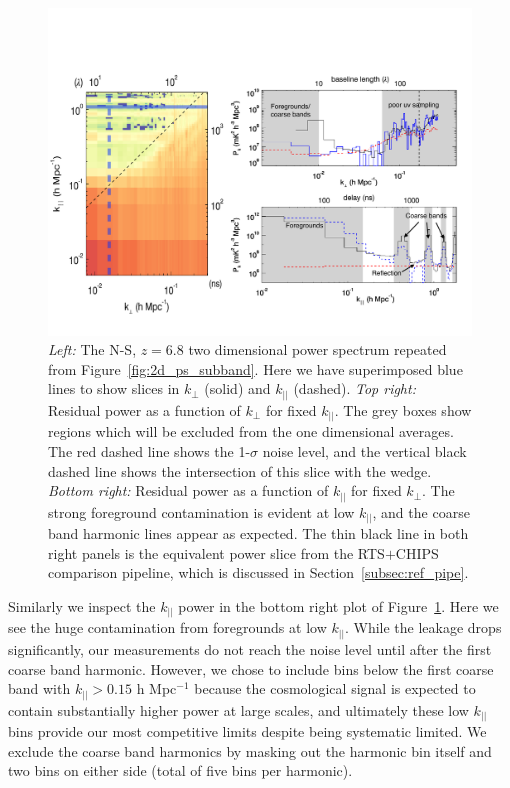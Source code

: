 \documentclass[iop]{emulateapj}
\begin{document}
\begin{figure}
\begin{center}
\includegraphics[width=\textwidth]{slices.pdf}
\caption{
\emph{Left:} The N-S, $z=6.8$ two dimensional power spectrum repeated from 
Figure~\ref{fig:2d_ps_subband}. Here we have superimposed blue lines to show slices in
$k_{\perp}$ (solid) and $k_{||}$ (dashed). \emph{Top right:} Residual power as a function
of $k_{\perp}$ for fixed $k_{||}$. The grey boxes show regions which will be excluded from
the one dimensional averages. The red dashed line shows the 1-$\sigma$ noise level, and
the vertical black dashed line shows the intersection of this slice with the wedge. 
\emph{Bottom right:} Residual power as a function of $k_{||}$ for fixed $k_{\perp}$. The strong
foreground contamination is evident at low $k_{||}$, and the coarse band harmonic lines
appear as expected. The thin black line in both right panels is the equivalent power slice from the RTS$+$CHIPS comparison pipeline, which is discussed in Section~\ref{subsec:ref_pipe}.
\label{fig:slices}
}
\end{center}
\end{figure}

Similarly we inspect the $k_{||}$ power in the bottom right plot of Figure~\ref{fig:slices}. Here
we see the huge contamination from foregrounds at low $k_{||}$. While the leakage drops 
significantly, our measurements do not reach the noise level until after the first coarse
band harmonic. However, we chose to include bins below the first coarse band with 
$k_{||}>0.15$ h Mpc$^{-1}$ because the cosmological signal is expected to contain 
substantially higher power at large scales, and ultimately these low $k_{||}$ bins provide
our most competitive limits despite being systematic limited. We exclude the coarse band
harmonics by masking out the harmonic bin itself and two bins on either side (total of five
bins per harmonic).
\end{document}
